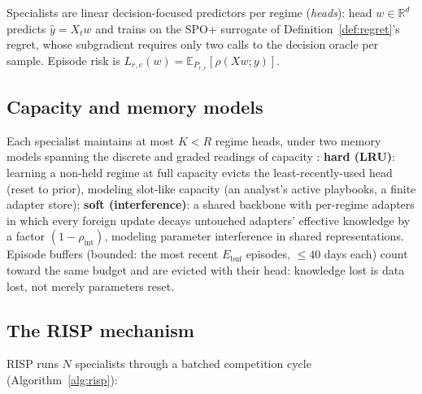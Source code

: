 \documentclass{article}
\newcommand{\R}{\mathbb{R}}
\newcommand{\E}{\mathbb{E}}
\newcommand{\nm}{\textsc{RISP}}
\newcommand{\regret}{\rho}
\begin{document}
Specialists are linear decision-focused predictors per regime
(\emph{heads}): head $w \in \R^d$ predicts $\hat y = X_t w$ and trains on
the SPO+ surrogate \citep{elmachtoub2022smart} of
Definition~\ref{def:regret}'s regret, whose subgradient requires only two
calls to the decision oracle per sample. Episode risk is
$L_{r,e}(w) = \E_{P_{r,e}}[\regret(Xw; y)]$.

\subsection{Capacity and memory models}
\label{sec:memory}

Each specialist maintains at most $K < R$ regime heads, under two memory
models spanning the discrete and graded readings of capacity
\citep{li2026gause}:
\textbf{hard (LRU)}: learning a non-held regime at full capacity evicts the
least-recently-used head (reset to prior), modeling slot-like capacity
(an analyst's active playbooks, a finite adapter store);
\textbf{soft (interference)}: a shared backbone with per-regime adapters in
which every foreign update decays untouched adapters' effective knowledge by
a factor $(1 - \rho_{\mathrm{int}})$, modeling parameter interference in
shared representations. Episode buffers (bounded: the most recent
$E_{\mathrm{buf}}$ episodes, $\le 40$ days each) count toward the same
budget and are evicted with their head: knowledge lost is data lost, not
merely parameters reset.

\subsection{The \nm{} mechanism}
\label{sec:mechanism}

\nm{} runs $N$ specialists through a batched competition cycle
(Algorithm~\ref{alg:risp}):
\end{document}
